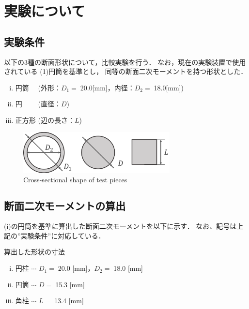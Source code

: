 \documentclass[twocolumn,a4j]{jsarticle}
\begin{document}
\section{実験について}

\subsection{実験条件}
以下の3種の断面形状について，比較実験を行う．
なお，現在の実験装置で使用されている (1)円筒を基準とし，
同等の断面二次モーメントを持つ形状とした．
\begin{enumerate}[(i)]
    \item 円筒 　(外形：$D_1=\;$20.0[mm]，内径：$D_2=\;$18.0[mm])
    \item 円　 　(直径：$D$)
    \item 正方形 (辺の長さ：$L$)
\end{enumerate}
\begin{figure}[htbp]
    \footnotesize
    \begin{center}
        \includegraphics[width=80mm]{../images/testpieces_2.png}
        \caption{Cross-sectional shape of test pieces}
    \end{center}
\end{figure}
\newpage
\subsection{断面二次モーメントの算出}
(i)の円筒を基準に算出した断面二次モーメントを以下に示す．
なお、記号は上記の”実験条件”に対応している．
\begin{itembox}[l]{算出した形状の寸法}
    \begin{enumerate}[(i)]
        \item 円柱 $\cdots$ $D_1=\;$20.0 [mm]，$D_2=\;$18.0 [mm]
        \item 円筒 $\cdots$ $D=\;$15.3 [mm]
        \item 角柱 $\cdots$ $L=\;$13.4 [mm]
    \end{enumerate}
\end{itembox}
\end{document}
